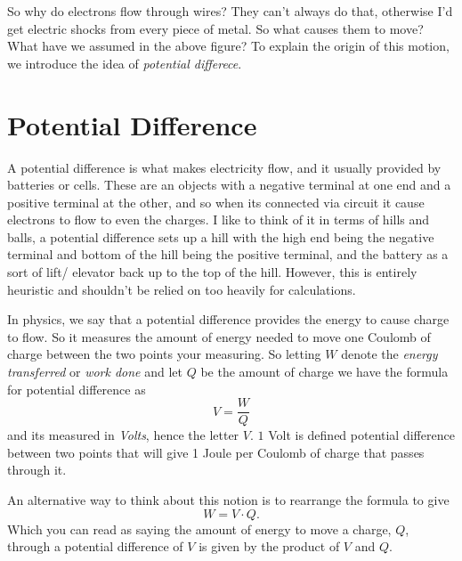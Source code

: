 \documentclass[12pt]{article}
\begin{document}
So why do electrons flow through wires? They can't always do that, otherwise I'd get electric shocks from every piece of metal. So what causes them to move? What have we assumed in the above figure? To explain the origin of this motion, we introduce the idea of \emph{potential differece}.




\section{Potential Difference}\label{potential-difference}
A potential difference is what makes electricity flow, and it usually provided by
batteries or cells. These are an objects with a negative terminal
at one end and a positive terminal at the other, and so when its
connected via circuit it cause electrons to flow to even the charges. I
like to think of it in terms of hills and balls, a potential difference
sets up a hill with the high end being the negative terminal and bottom
of the hill being the positive terminal, and the battery as a sort of
lift/ elevator back up to the top of the hill. However, this is entirely
heuristic and shouldn't be relied on too heavily for calculations.

In physics, we say that a potential difference provides the energy to
cause charge to flow. So it measures the amount of energy needed to move
one Coulomb of charge between the two points your measuring. So letting
\(W\) denote the \emph{energy transferred} or \emph{work done} and let
\(Q\) be the amount of charge we have the formula for potential
difference as \[V = \frac{W}{Q}\] and its measured in \emph{Volts},
hence the letter \(V\). \(1\) Volt is defined potential difference
between two points that will give 1 Joule per Coulomb of charge that
passes through it.

An alternative way to think about this notion is to rearrange the
formula to give \[W = V \cdot Q.\] Which you can read as saying the
amount of energy to move a charge, \(Q\), through a potential difference
of \(V\) is given by the product of \(V\) and \(Q\).

\end{document}
